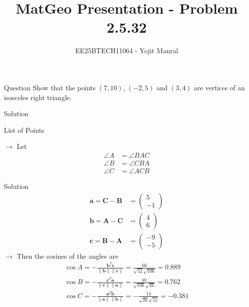 \documentclass{beamer}
\title{MatGeo Presentation - Problem 2.5.32}
\author{EE25BTECH11064 - Yojit Manral}
\date{}
\numberwithin{equation}{section}
\providecommand{\brak}[1]{\ensuremath{\left(#1\right)}}
\theoremstyle{remark}
\providecommand{\norm}[1]{\lVert#1\rVert}
\newcommand{\myvec}[1]{\ensuremath{\begin{pmatrix}#1\end{pmatrix}}}
\let\vec\mathbf
\begin{document}
\frame{\titlepage}
\begin{frame}{Question}
Show that the points $\brak{7,10}$, $\brak{-2,5}$ and $\brak{3,4}$ are vertices of an isosceles right triangle.
\end{frame}

\begin{frame}{Solution}
\begin{table}[h!]    
  \centering
  
  \caption{List of Points}
  \label{Table_1}
\end{table}
$\rightarrow$ Let
\begin{align}
    \angle{A} &= \angle{BAC}\\
    \angle{B} &= \angle{CBA}\\
    \angle{C} &= \angle{ACB}
\end{align}
\end{frame}

\begin{frame}{Solution}
\begin{align}
    \vec{a} = \vec{C} - \vec{B} &= \myvec{5\\-1}\\
    \vec{b} = \vec{A} - \vec{C} &= \myvec{4\\6}\\
    \vec{c} = \vec{B} - \vec{A} &= \myvec{-9\\-5}
\end{align}
$\rightarrow$ Then the cosines of the angles are
\begin{align}
    \cos{A} = -\frac{\vec{b}^{T}\vec{c}}{\norm{\vec{b}}\norm{\vec{c}}} = \frac{66}{\sqrt{52}\sqrt{106}} = 0.889\\
    \cos{B} = -\frac{\vec{c}^{T}\vec{a}}{\norm{\vec{c}}\norm{\vec{a}}} = \frac{40}{\sqrt{106}\sqrt{26}} = 0.762\\
    \cos{C} = -\frac{\vec{a}^{T}\vec{b}}{\norm{\vec{a}}\norm{\vec{b}}} = -\frac{14}{\sqrt{26}\sqrt{52}} = -0.381
\end{align}
\end{frame}
\end{document}
